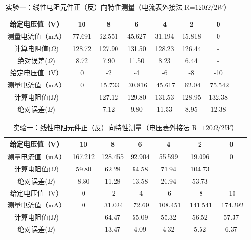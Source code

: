 \documentclass[a4paper]{article}
\begin{document}
    \begin{table}[!ht]
        \caption{实验一：线性电阻元件正（反）向特性测量（电流表外接法 R=$120\Omega/2W$）}\label{tab:exp4}
        \begin{tabularx}{\textwidth}{c*{6}{C}} \toprule
            给定电压值（V） & 10 & 8 & 6 & 4 & 2 & 0 \\ \midrule
            测量电流值（mA） & 77.691 & 62.551 & 45.627 & 31.194 & 15.818 & 0 \\ 
            计算电阻值($\Omega $) & 128.72 & 127.90 & 131.50 & 128.23 & 126.44 & - \\   
            绝对误差($\Omega $) & 8.72 & 7.90 & 11.50 & 8.23 & 6.44 & - \\ \midrule 给定电压值（V） & 0 & -2 & -4 & -6 & -8 & -10 \\ \midrule 测量电流值（mA） & 0 & -15.733 & -30.816 & -45.617 & -62.04 & -75.542 \\ 
            计算电阻值($\Omega $) & - & 127.12 & 129.80 & 131.53 & 128.95 & 132.38 \\ 
            绝对误差($\Omega $) & - & 7.12 & 9.80 & 11.53 & 8.95 & 12.38 \\
            \bottomrule
        \end{tabularx}
    \end{table}
    \begin{table}[!ht]
        \caption{实验一：线性电阻元件正（反）向特性测量（电压表外接法 R=$120\Omega/2W$）}\label{tab:exp4}
        \begin{tabularx}{\textwidth}{c*{6}{C}} \toprule
            给定电压值（V） & 10 & 8 & 6 & 4 & 2 & 0 \\ \midrule
            测量电流值（mA） & 167.212 & 128.455 & 92.904 & 55.599 & 19.096 & 0 \\ 
            计算电阻值($\Omega $) & 59.80 & 62.28 & 64.58 & 71.94 & 104.73 & - \\ 
            绝对误差($\Omega $) & 8.80 & 11.28 & 13.58 & 20.94 & 53.73 \\ \midrule
            给定电压值（V） & 0 & -2 & -4 & -6 & -8 & -10 \\ \midrule
            测量电流值（mA） & 0 & -31.024 & -72.69 & -108.451 & -141.541 & -174.292 \\ 
            计算电阻值($\Omega $) & - & 64.47 & 55.09 & 55.32 & 56.52 & 57.37 \\ 
            绝对误差($\Omega $) & - & 13.47 & 4.09 & 4.32 & 5.52 & 6.37 \\
            \bottomrule
        \end{tabularx}
    \end{table}
\end{document}
